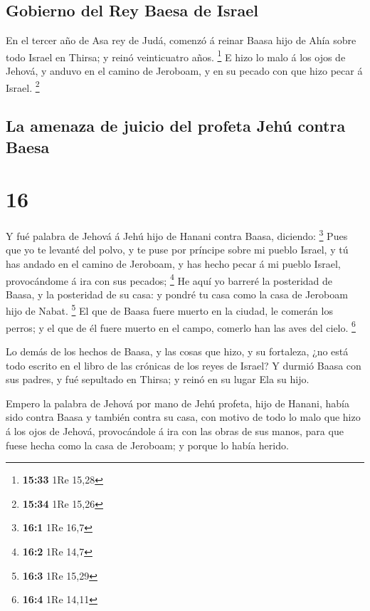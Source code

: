 \hypertarget{gobierno-del-rey-baesa-de-israel}{%
\subsection{Gobierno del Rey Baesa de
Israel}\label{gobierno-del-rey-baesa-de-israel}}

 En el tercer año de Asa rey de Judá, comenzó á reinar
Baasa hijo de Ahía sobre todo Israel en Thirsa; y reinó veinticuatro
años. \footnote{\textbf{15:33} 1Re 15,28}  E hizo lo malo á
los ojos de Jehová, y anduvo en el camino de Jeroboam, y en su pecado
con que hizo pecar á Israel. \footnote{\textbf{15:34} 1Re 15,26}

\hypertarget{la-amenaza-de-juicio-del-profeta-jehuxfa-contra-baesa}{%
\subsection{La amenaza de juicio del profeta Jehú contra
Baesa}\label{la-amenaza-de-juicio-del-profeta-jehuxfa-contra-baesa}}

\hypertarget{section-15}{%
\section{16}\label{section-15}}

 Y fué palabra de Jehová á Jehú hijo de Hanani contra Baasa,
diciendo: \footnote{\textbf{16:1} 1Re 16,7}  Pues que yo te
levanté del polvo, y te puse por príncipe sobre mi pueblo Israel, y tú
has andado en el camino de Jeroboam, y has hecho pecar á mi pueblo
Israel, provocándome á ira con sus pecados; \footnote{\textbf{16:2} 1Re
  14,7}  He aquí yo barreré la posteridad de Baasa, y la
posteridad de su casa: y pondré tu casa como la casa de Jeroboam hijo de
Nabat. \footnote{\textbf{16:3} 1Re 15,29}  El que de Baasa
fuere muerto en la ciudad, le comerán los perros; y el que de él fuere
muerto en el campo, comerlo han las aves del cielo. \footnote{\textbf{16:4}
  1Re 14,11}

 Lo demás de los hechos de Baasa, y las cosas que hizo, y su
fortaleza, ¿no está todo escrito en el libro de las crónicas de los
reyes de Israel?  Y durmió Baasa con sus padres, y fué
sepultado en Thirsa; y reinó en su lugar Ela su hijo.

 Empero la palabra de Jehová por mano de Jehú profeta, hijo
de Hanani, había sido contra Baasa y también contra su casa, con motivo
de todo lo malo que hizo á los ojos de Jehová, provocándole á ira con
las obras de sus manos, para que fuese hecha como la casa de Jeroboam; y
porque lo había herido.

